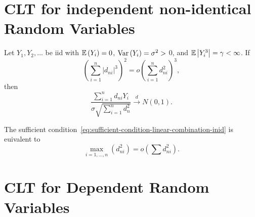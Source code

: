 \section{CLT for independent non-identical Random Variables}

\begin{theorem}\label{thm:liapounov-clt}

\end{theorem}

\begin{theorem}\label{thm:linear-combination-inid}
	Let \(Y_1,Y_2,\ldots\) be iid with \(\mathbb{E}\left(Y_{i}\right)=0\), \(\mathrm{Var}\left(Y_{i}\right)=\sigma^2>\) 0, and \(\mathbb{E}\left|Y_{i}^3\right|=\gamma<\infty\). If
	\begin{equation}
		\label{eq:sufficient-condition-linear-combination-inid}
		\left(\sum_{i=1}^n\left|d_{ni}\right|^3\right)^2=o\left(\sum_{i=1}^{n}d_{ni}^2\right)^3,
	\end{equation}
	then
	\begin{equation*}
		\frac{\sum_{i=1}^{n}d_{ni}Y_{i}}{\sigma\sqrt{\sum_{i=1}^{n}d_{n }^2}}\stackrel{d}{\rightarrow}N(0,1).
	\end{equation*}
\end{theorem}

\begin{corollary}
	The sufficient condition~\eqref{eq:sufficient-condition-linear-combination-inid} is euivalent to
	\begin{equation}
		\max_{i=1,\ldots,n}\left(d_{ni}^2\right)=o\left(\sum d_{ni}^2\right).
	\end{equation}
\end{corollary}

\section{CLT for Dependent Random Variables}

